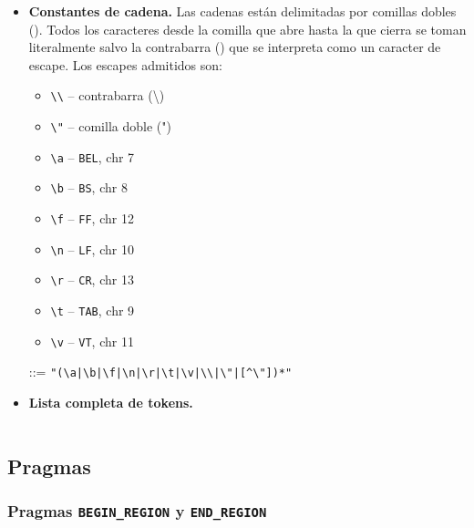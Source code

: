 \documentclass{article}
\begin{document}
\begin{itemize}
\item {\bf Constantes de cadena.}
  Las cadenas est\'an delimitadas por comillas dobles ().
  Todos los caracteres desde la comilla que abre hasta la que cierra se
  toman literalmente salvo la contrabarra (\chr{\textbackslash}) que se
  interpreta como un caracter de escape.
  Los escapes admitidos son:
  \begin{itemize}
  \item \texttt{\textbackslash\textbackslash} -- contrabarra (\textbackslash)
  \item \texttt{\textbackslash"} -- comilla doble (")
  \item \texttt{\textbackslash{a}} -- \texttt{BEL}, chr 7
  \item \texttt{\textbackslash{b}} -- \texttt{BS}, chr 8
  \item \texttt{\textbackslash{f}} -- \texttt{FF}, chr 12
  \item \texttt{\textbackslash{n}} -- \texttt{LF}, chr 10
  \item \texttt{\textbackslash{r}} -- \texttt{CR}, chr 13
  \item \texttt{\textbackslash{t}} -- \texttt{TAB}, chr 9
  \item \texttt{\textbackslash{v}} -- \texttt{VT}, chr 11
  \end{itemize}
  \begin{center}
     ::= \texttt{"(\textbackslash{a}|\textbackslash{b}|\textbackslash{f}|\textbackslash{n}|\textbackslash{r}|\textbackslash{t}|\textbackslash{v}|\textbackslash\textbackslash|\textbackslash"|[\^{}\textbackslash"])*"}
  \end{center}

\item {\bf Lista completa de tokens.}
  \begin{longtable}{llp{}}
  
  \end{longtable}
\end{itemize}

\subsection{Pragmas}

\subsubsection{Pragmas \texttt{BEGIN\_REGION} y \texttt{END\_REGION}}
\end{document}

